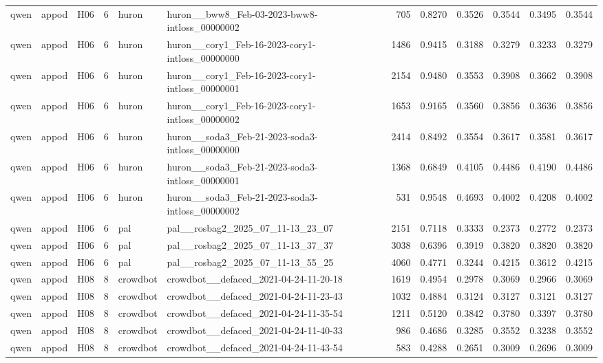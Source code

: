 \begin{table}[tbp]
\begin{tabular}{lllrllrrrrrr}
qwen & appod & H06 & 6 & huron & huron\_\_bww8\_Feb-03-2023-bww8-intloss\_00000002 & 705 & 0.8270 & 0.3526 & 0.3544 & 0.3495 & 0.3544 \\
qwen & appod & H06 & 6 & huron & huron\_\_cory1\_Feb-16-2023-cory1-intloss\_00000000 & 1486 & 0.9415 & 0.3188 & 0.3279 & 0.3233 & 0.3279 \\
qwen & appod & H06 & 6 & huron & huron\_\_cory1\_Feb-16-2023-cory1-intloss\_00000001 & 2154 & 0.9480 & 0.3553 & 0.3908 & 0.3662 & 0.3908 \\
qwen & appod & H06 & 6 & huron & huron\_\_cory1\_Feb-16-2023-cory1-intloss\_00000002 & 1653 & 0.9165 & 0.3560 & 0.3856 & 0.3636 & 0.3856 \\
qwen & appod & H06 & 6 & huron & huron\_\_soda3\_Feb-21-2023-soda3-intloss\_00000000 & 2414 & 0.8492 & 0.3554 & 0.3617 & 0.3581 & 0.3617 \\
qwen & appod & H06 & 6 & huron & huron\_\_soda3\_Feb-21-2023-soda3-intloss\_00000001 & 1368 & 0.6849 & 0.4105 & 0.4486 & 0.4190 & 0.4486 \\
qwen & appod & H06 & 6 & huron & huron\_\_soda3\_Feb-21-2023-soda3-intloss\_00000002 & 531 & 0.9548 & 0.4693 & 0.4002 & 0.4208 & 0.4002 \\
qwen & appod & H06 & 6 & pal & pal\_\_rosbag2\_2025\_07\_11-13\_23\_07 & 2151 & 0.7118 & 0.3333 & 0.2373 & 0.2772 & 0.2373 \\
qwen & appod & H06 & 6 & pal & pal\_\_rosbag2\_2025\_07\_11-13\_37\_37 & 3038 & 0.6396 & 0.3919 & 0.3820 & 0.3820 & 0.3820 \\
qwen & appod & H06 & 6 & pal & pal\_\_rosbag2\_2025\_07\_11-13\_55\_25 & 4060 & 0.4771 & 0.3244 & 0.4215 & 0.3612 & 0.4215 \\
qwen & appod & H08 & 8 & crowdbot & crowdbot\_\_defaced\_2021-04-24-11-20-18 & 1619 & 0.4954 & 0.2978 & 0.3069 & 0.2966 & 0.3069 \\
qwen & appod & H08 & 8 & crowdbot & crowdbot\_\_defaced\_2021-04-24-11-23-43 & 1032 & 0.4884 & 0.3124 & 0.3127 & 0.3121 & 0.3127 \\
qwen & appod & H08 & 8 & crowdbot & crowdbot\_\_defaced\_2021-04-24-11-35-54 & 1211 & 0.5120 & 0.3842 & 0.3780 & 0.3397 & 0.3780 \\
qwen & appod & H08 & 8 & crowdbot & crowdbot\_\_defaced\_2021-04-24-11-40-33 & 986 & 0.4686 & 0.3285 & 0.3552 & 0.3238 & 0.3552 \\
qwen & appod & H08 & 8 & crowdbot & crowdbot\_\_defaced\_2021-04-24-11-43-54 & 583 & 0.4288 & 0.2651 & 0.3009 & 0.2696 & 0.3009 \\

\end{tabular}
\end{table}
